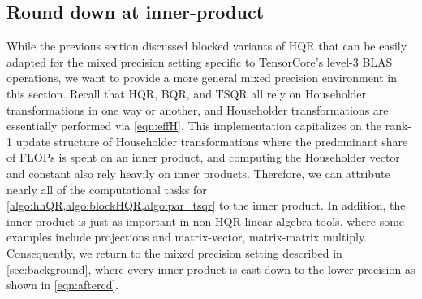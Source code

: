 \subsection{Round down at inner-product}\label{sec:mp-2}
While the previous section discussed blocked variants of HQR that can be easily adapted for the mixed precision setting specific to TensorCore's level-3 BLAS operations, we want to provide a more general mixed precision environment in this section.
Recall that HQR, BQR, and TSQR all rely on Householder transformations in one way or another, and Householder transformations are essentially performed via \cref{eqn:effH}.
This implementation capitalizes on the rank-1 update structure of Householder transformations where the predominant share of FLOPs is spent on an inner product, and computing the Householder vector and constant also rely heavily on inner products.
Therefore, we can attribute nearly all of the computational tasks for \cref{algo:hhQR,algo:blockHQR,algo:par_tsqr} to the inner product.
In addition, the inner product is just as important in non-HQR linear algebra tools, where some examples include projections and matrix-vector, matrix-matrix multiply.
Consequently, we return to the mixed precision setting described in \cref{sec:background}, where every inner product is cast down to the lower precision as shown in \cref{eqn:aftercd}.
